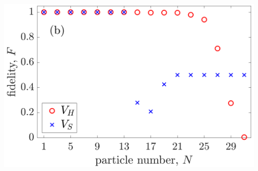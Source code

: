 \documentclass{beamer}
\begin{document}
\begin{frame}
\begin{columns}
\includegraphics[width=\linewidth]{../data/1d/fig7b.png}
\end{columns}

\end{frame}
\end{document}
